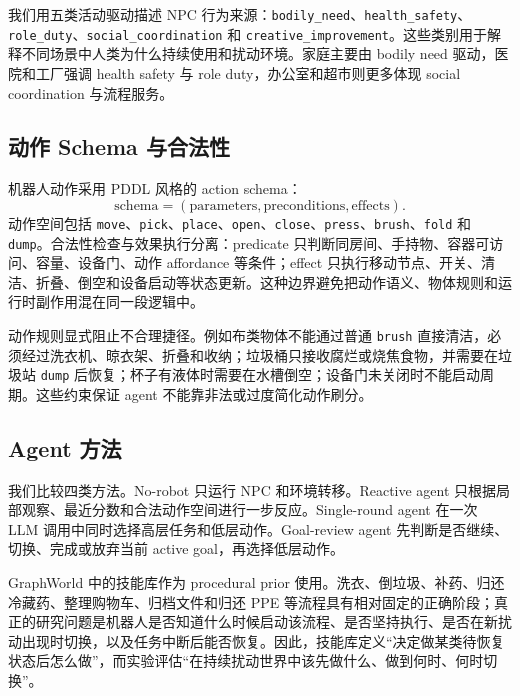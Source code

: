\documentclass[journal]{IEEEtran}
\begin{document}
我们用五类活动驱动描述 NPC 行为来源：\texttt{bodily\_need}、\texttt{health\_safety}、\texttt{role\_duty}、\texttt{social\_coordination} 和 \texttt{creative\_improvement}。这些类别用于解释不同场景中人类为什么持续使用和扰动环境。家庭主要由 bodily need 驱动，医院和工厂强调 health safety 与 role duty，办公室和超市则更多体现 social coordination 与流程服务。

\subsection{动作 Schema 与合法性}
机器人动作采用 PDDL 风格的 action schema：
\begin{equation}
\text{schema} = (\text{parameters}, \text{preconditions}, \text{effects}).
\end{equation}
动作空间包括 \texttt{move}、\texttt{pick}、\texttt{place}、\texttt{open}、\texttt{close}、\texttt{press}、\texttt{brush}、\texttt{fold} 和 \texttt{dump}。合法性检查与效果执行分离：predicate 只判断同房间、手持物、容器可访问、容量、设备门、动作 affordance 等条件；effect 只执行移动节点、开关、清洁、折叠、倒空和设备启动等状态更新。这种边界避免把动作语义、物体规则和运行时副作用混在同一段逻辑中。

动作规则显式阻止不合理捷径。例如布类物体不能通过普通 \texttt{brush} 直接清洁，必须经过洗衣机、晾衣架、折叠和收纳；垃圾桶只接收腐烂或烧焦食物，并需要在垃圾站 \texttt{dump} 后恢复；杯子有液体时需要在水槽倒空；设备门未关闭时不能启动周期。这些约束保证 agent 不能靠非法或过度简化动作刷分。

\subsection{Agent 方法}
我们比较四类方法。No-robot 只运行 NPC 和环境转移。Reactive agent 只根据局部观察、最近分数和合法动作空间进行一步反应。Single-round agent 在一次 LLM 调用中同时选择高层任务和低层动作。Goal-review agent 先判断是否继续、切换、完成或放弃当前 active goal，再选择低层动作。

GraphWorld 中的技能库作为 procedural prior 使用。洗衣、倒垃圾、补药、归还冷藏药、整理购物车、归档文件和归还 PPE 等流程具有相对固定的正确阶段；真正的研究问题是机器人是否知道什么时候启动该流程、是否坚持执行、是否在新扰动出现时切换，以及任务中断后能否恢复。因此，技能库定义“决定做某类待恢复状态后怎么做”，而实验评估“在持续扰动世界中该先做什么、做到何时、何时切换”。
\end{document}
